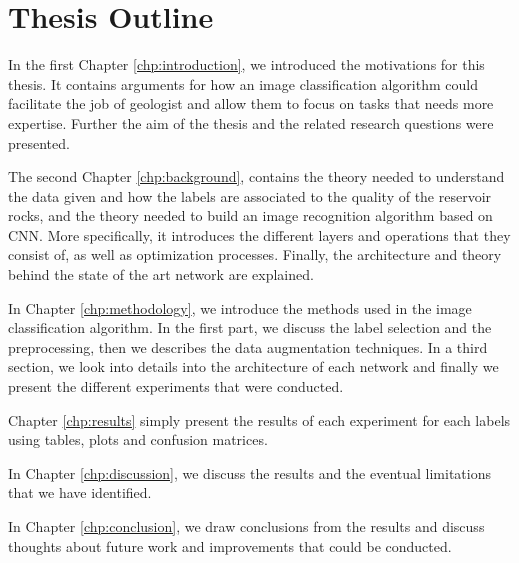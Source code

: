 \section{Thesis Outline}

In the first Chapter \ref{chp:introduction}, we introduced the motivations for this thesis. It contains arguments for how an image classification algorithm could facilitate the job of geologist and allow them to focus on tasks that needs more expertise. Further the aim of the thesis and the related research questions were presented. 


The second Chapter \ref{chp:background}, contains the theory needed to understand the data given and how the labels are associated to the quality of the reservoir rocks, and the theory needed to build an image recognition algorithm based on CNN. More specifically, it introduces the different layers and operations that they consist of, as well as optimization processes. Finally, the architecture and theory behind the state of the art network are explained.
 

In Chapter \ref{chp:methodology}, we introduce the methods used in the image classification algorithm. In the first part, we discuss the label selection and the preprocessing, then we describes the data augmentation techniques. In a third section, we look into details into the architecture of each network and finally we present the different experiments that were conducted.  


Chapter  \ref{chp:results} simply present the results of each experiment for each labels using tables, plots and confusion matrices.


In Chapter \ref{chp:discussion}, we discuss the results and the eventual limitations that we have identified.


In Chapter \ref{chp:conclusion}, we draw conclusions from the results and discuss thoughts about future work and improvements that could be conducted. 
